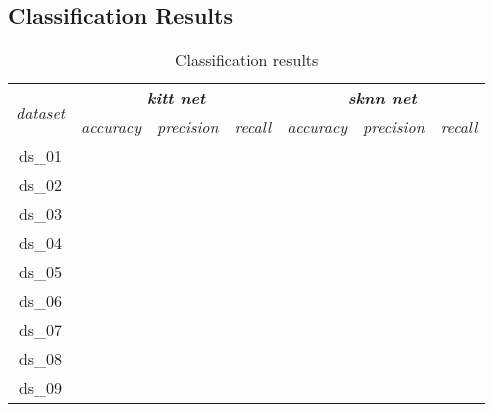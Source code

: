 \subsection{Classification Results} \label{ssec:classification_results}

\begin{table}[H]
\centering
\caption{Classification results}
\label{tab:classification_results}
\begin{tabular}{|c|c|c|c|c|c|c|}
\hline
\multirow{2}{*}{\textit{dataset}} & \multicolumn{3}{c|}{\textit{\textbf{kitt net}}}         & \multicolumn{3}{c|}{\textit{\textbf{sknn net}}}         \\ \cline{2-7} 
                                  & \textit{accuracy} & \textit{precision} & \textit{recall} & \textit{accuracy} & \textit{precision} & \textit{recall} \\ \hline
ds\_01                            &                   &                    &                 &                   &                    &                 \\ \hline
ds\_02                            &                   &                    &                 &                   &                    &                 \\ \hline
ds\_03                            &                   &                    &                 &                   &                    &                 \\ \hline
ds\_04                            &                   &                    &                 &                   &                    &                 \\ \hline
ds\_05                            &                   &                    &                 &                   &                    &                 \\ \hline
ds\_06                            &                   &                    &                 &                   &                    &                 \\ \hline
ds\_07                            &                   &                    &                 &                   &                    &                 \\ \hline
ds\_08                            &                   &                    &                 &                   &                    &                 \\ \hline
ds\_09                            &                   &                    &                 &                   &                    &                 \\ \hline

\end{tabular}
\end{table}
